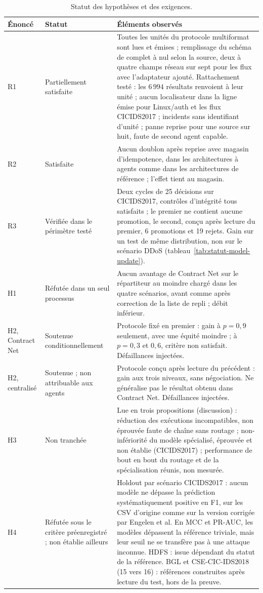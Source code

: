\begin{table}[H]
\centering
\caption{Statut des hypothèses et des exigences.}
\label{tab:statut-hypotheses}
\footnotesize
\begin{tabularx}{\textwidth}{p{} p{} X}
\toprule
\textbf{Énoncé} & \textbf{Statut} & \textbf{Éléments observés} \\
\midrule
R1 & Partiellement satisfaite & Toutes les unités du protocole multiformat sont lues et émises ; remplissage du schéma de complet à nul selon la source, deux à quatre champs réseau sur sept pour les flux avec l'adaptateur ajouté. Rattachement testé : les $6\,994$ résultats renvoient à leur unité ; aucun localisateur dans la ligne émise pour Linux/auth et les flux CICIDS2017 ; incidents sans identifiant d'unité ; panne reprise pour une source sur huit, faute de second agent capable. \\
R2 & Satisfaite & Aucun doublon après reprise avec magasin d'idempotence, dans les architectures à agents comme dans les architectures de référence ; l'effet tient au magasin. \\
R3 & Vérifiée dans le périmètre testé & Deux cycles de 25 décisions sur CICIDS2017, contrôles d'intégrité tous satisfaits ; le premier ne contient aucune promotion, le second, conçu après lecture du premier, 6 promotions et 19 rejets. Gain sur un test de même distribution, non sur le scénario DDoS (tableau~\ref{tab:statut-model-update}). \\
H1 & Réfutée dans un seul processus & Aucun avantage de Contract Net sur le répartiteur au moindre chargé dans les quatre scénarios, avant comme après correction de la liste de repli ; débit inférieur. \\
H2, Contract Net & Soutenue conditionnellement & Protocole fixé en premier : gain à $p=0{,}9$ seulement, avec une équité moindre ; à $p=0{,}3$ et $0{,}6$, critère non satisfait. Défaillances injectées. \\
H2, centralisé & Soutenue ; non attribuable aux agents & Protocole conçu après lecture du précédent : gain aux trois niveaux, sans négociation. Ne généralise pas le résultat obtenu dans Contract Net. Défaillances injectées. \\
H3 & Non tranchée & Lue en trois propositions (discussion) : réduction des exécutions incompatibles, non éprouvée faute de chaîne sans routage ; non-infériorité du modèle spécialisé, éprouvée et non établie (CICIDS2017) ; performance de bout en bout du routage et de la spécialisation réunis, non mesurée. \\
H4 & Réfutée sous le critère préenregistré ; non établie ailleurs & Holdout par scénario CICIDS2017 : aucun modèle ne dépasse la prédiction systématiquement positive en F1, sur les CSV d'origine comme sur la version corrigée par Engelen et al. En MCC et PR-AUC, les modèles dépassent la référence triviale, mais leur seuil ne se transfère pas à une attaque inconnue. HDFS : issue dépendant du statut de la référence. BGL et CSE-CIC-IDS2018 (15 vers 16) : références construites après lecture du test, hors de la preuve. \\
\bottomrule
\end{tabularx}
\end{table}

